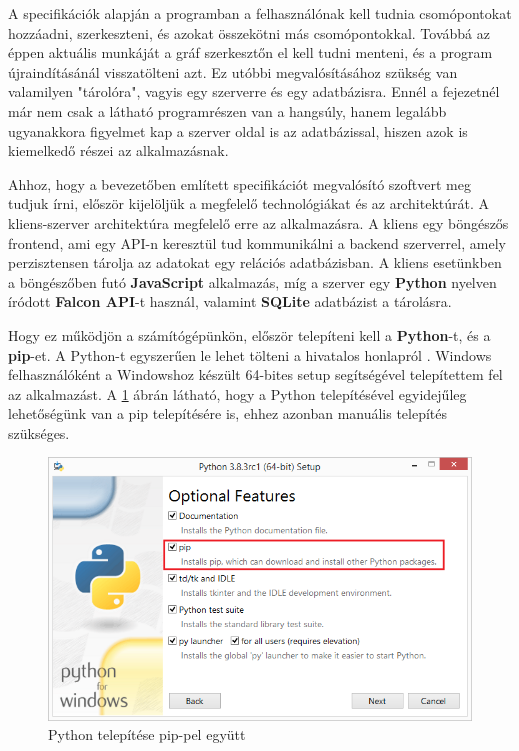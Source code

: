 

A specifikációk alapján a programban a felhasználónak kell tudnia csomópontokat hozzáadni, szerkeszteni, és azokat összekötni más csomópontokkal. Továbbá az éppen aktuális munkáját a gráf szerkesztőn el kell tudni menteni, és a program újraindításánál visszatölteni azt. Ez utóbbi megvalósításához szükség van valamilyen "tárolóra", vagyis egy szerverre és egy adatbázisra. Ennél a fejezetnél már nem csak a látható programrészen van a hangsúly, hanem legalább ugyanakkora figyelmet kap a szerver oldal is az adatbázissal, hiszen azok is kiemelkedő részei az alkalmazásnak.


Ahhoz, hogy a bevezetőben említett specifikációt megvalósító szoftvert meg tudjuk írni, először kijelöljük a megfelelő technológiákat és az architektúrát. A kliens-szerver architektúra megfelelő erre az alkalmazásra. A kliens egy böngészős frontend, ami egy API-n keresztül tud kommunikálni a backend szerverrel, amely perzisztensen tárolja az adatokat egy relációs adatbázisban. A kliens esetünkben a böngészőben futó \textbf{JavaScript} alkalmazás, míg a szerver egy \textbf{Python} nyelven íródott \textbf{Falcon API}-t használ, valamint \textbf{SQLite} adatbázist a tárolásra.
 
Hogy ez működjön a számítógépünkön, először telepíteni kell a \textbf{Python}-t, és a \textbf{pip}-et. A Python-t egyszerűen le lehet tölteni a hivatalos honlapról \cite{python}. Windows felhasználóként a Windowshoz készült 64-bites setup segítségével telepítettem fel az alkalmazást. A \ref{fig:pyt1} ábrán látható, hogy a Python telepítésével egyidejűleg lehetőségünk van a pip telepítésére is, ehhez azonban manuális telepítés szükséges.

\begin{figure}[h]
\centering
\includegraphics[scale=0.7]{images/python1.png}
\caption{Python telepítése pip-pel együtt}
\label{fig:pyt1}
\end{figure}

